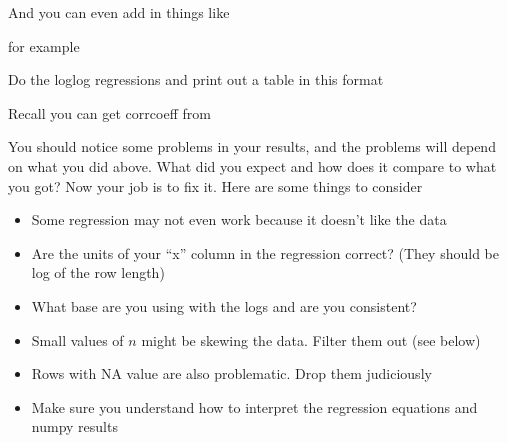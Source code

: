 \documentclass[letterpaper,10pt,english]{jupyterBook}
\begin{document}
\sphinxAtStartPar
And you can even add in things like

\begin{sphinxVerbatim}[commandchars=\\\{\}]
  
  
  
    
\end{sphinxVerbatim}

\sphinxAtStartPar
for example

\sphinxAtStartPar
Do the log\sphinxhyphen{}log regressions and print out a table in this format

\begin{sphinxVerbatim}[commandchars=\\\{\}]
         
\end{sphinxVerbatim}

\sphinxAtStartPar
Recall you can get corrcoeff from

\begin{sphinxVerbatim}[commandchars=\\\{\}]
\PYG{p}{[}\PYG{p}{]}
\end{sphinxVerbatim}

\sphinxAtStartPar
You should notice some problems in your results, and the problems will depend on what you did above. What did you expect and how does it compare to what you got? Now your
job is to fix it. Here are some things to consider
\begin{itemize}
\item {} 
\sphinxAtStartPar
Some regression may not even work because it doesn’t like the data

\item {} 
\sphinxAtStartPar
Are the units of your “x” column in the regression correct? (They should be log of the row length)

\item {} 
\sphinxAtStartPar
What base are you using with the logs and are you consistent?

\item {} 
\sphinxAtStartPar
Small values of \(n\) might be skewing the data. Filter them out (see below)

\item {} 
\sphinxAtStartPar
Rows with NA value are also problematic. Drop them judiciously

\item {} 
\sphinxAtStartPar
Make sure you understand how to interpret the regression equations and numpy results

\end{itemize}
\end{document}
